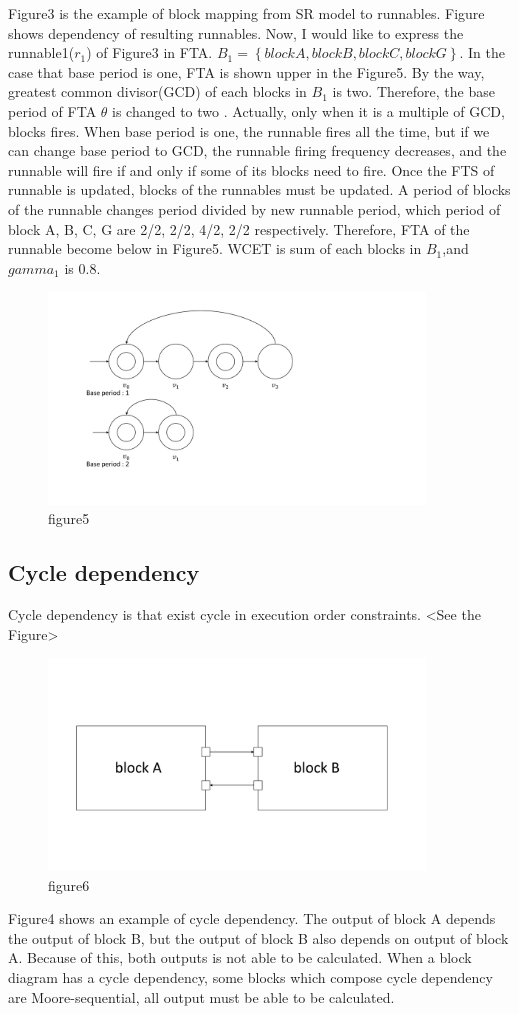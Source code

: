 \documentclass[conference,compsoc]{IEEEtran}
\begin{document}
Figure3 is the example of block mapping from SR model to runnables.
Figure shows dependency of resulting runnables.
Now, I would like to express  the runnable1($r_1$) of Figure3 in FTA.
$B_1 = \left\{block A, block B, block C, block G\right\}$.
In the case that base period is one, FTA is shown upper in the Figure5.
By the way, greatest common divisor(GCD) of each blocks in $B_1$ is two.
Therefore, the base period of FTA $\theta$ is changed to two .
Actually, only when it is a multiple of GCD, blocks fires.
When base period is one, the runnable fires all the time, but if we can change base period to GCD, the runnable firing frequency decreases, and the runnable will fire if and only if some of its blocks need to fire. 
 Once the FTS of runnable is updated, blocks of the runnables must be updated.
A period of blocks of the runnable changes period divided by new runnable period, which period of block A, B, C, G are 2/2, 2/2, 4/2, 2/2 respectively.
Therefore, FTA of the runnable become below in Figure5.  
 WCET is sum of each blocks in $B_1$,and $gamma_1$ is 0.8.


\begin{figure}
	\centering
	\includegraphics[width=10cm,clip]{figure9.pdf}
	\caption{figure5}
	\label{fig5}
\end{figure}


\subsection{Cycle dependency}
 Cycle dependency is that exist cycle in execution order constraints. <See the Figure>
\begin{figure}
	\centering
	\includegraphics[width=10cm,clip]{figure4.pdf}
	\caption{figure6}
	\label{fig6}
\end{figure}
 Figure4 shows an example of cycle dependency.
The output of block A depends the output of block B, but the output of block B also depends on output of block A.
Because of this, both outputs is not able to be calculated.
When a block diagram has a cycle dependency, some blocks which compose cycle dependency are Moore-sequential, all output must be able to be calculated.
\end{document}
